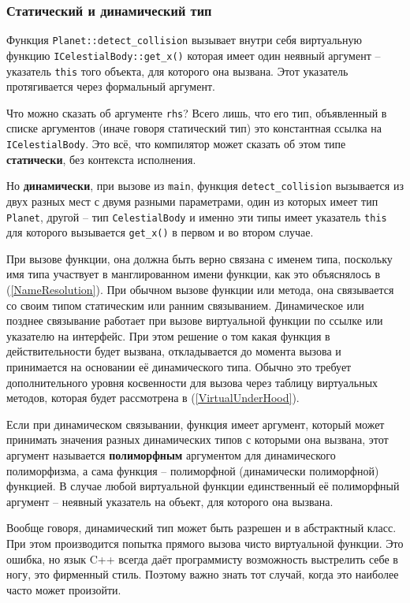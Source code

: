 \documentclass[a4paper,12pt,oneside]{article}
\begin{document}
\subsubsection{Статический и динамический тип}\label{StatDynPoly}

Функция \lstinline!Planet::detect_collision! вызывает внутри себя виртуальную функцию \lstinline!ICelestialBody::get_x()! которая имеет один неявный аргумент -- указатель \lstinline!this! того объекта, для которого она вызвана. Этот указатель протягивается через формальный аргумент. 

Что можно сказать об аргументе \lstinline!rhs!? Всего лишь, что его тип, объявленный в списке аргументов (иначе говоря статический тип) это константная ссылка на \lstinline!ICelestialBody!. Это всё, что компилятор может сказать об этом типе \textbf{статически}, без контекста исполнения.

Но \textbf{динамически}, при вызове из \lstinline!main!, функция \lstinline!detect_collision! вызывается из двух разных мест с двумя разными параметрами, один из которых имеет тип \lstinline!Planet!, другой – тип \lstinline!CelestialBody! и именно эти типы имеет указатель \lstinline!this! для которого вызывается \lstinline!get_x()! в первом и во втором случае.

При вызове функции, она должна быть верно связана с именем типа, поскольку имя типа участвует в манглированном имени функции, как это объяснялось в (\ref{NameResolution}). При обычном вызове функции или метода, она связывается со своим типом статическим или ранним связыванием. Динамическое или позднее связывание работает при вызове виртуальной функции по ссылке или указателю на интерфейс. При этом решение о том какая функция в действительности будет вызвана, откладывается до момента вызова и принимается на основании её динамического типа. Обычно это требует дополнительного уровня косвенности для вызова через таблицу виртуальных методов, которая будет рассмотрена в (\ref{VirtualUnderHood}).

Если при динамическом связывании, функция имеет аргумент, который может принимать значения разных динамических типов с которыми она вызвана, этот аргумент называется \textbf{полиморфным} аргументом для динамического полиморфизма, а сама функция -- полиморфной (динамически полиморфной) функцией. В случае любой виртуальной функции единственный её полиморфный аргумент -- неявный указатель на объект, для которого она вызвана.

Вообще говоря, динамический тип может быть разрешен и в абстрактный класс. При этом производится попытка прямого вызова чисто виртуальной функции. Это ошибка, но язык C++ всегда даёт программисту возможность выстрелить себе в ногу, это фирменный стиль. Поэтому важно знать тот случай, когда это наиболее часто может произойти.
\end{document}
